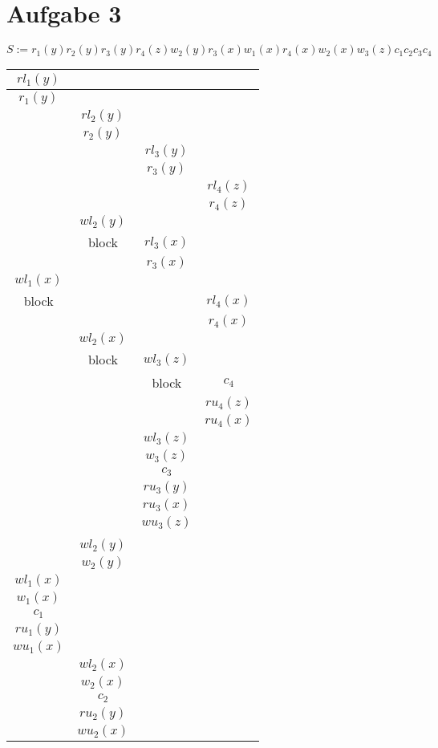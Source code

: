 \documentclass{scrartcl}
\begin{document}
\section*{Aufgabe 3}

$S := r_1(y)r_2(y)r_3(y)r_4(z)w_2(y)r_3(x)w_1(x)r_4(x)w_2(x)w_3(z)c_1c_2c_3c_4$\\
\begin{tabular}{|c|c|c|c|}
\hline $rl_1(y)$ &  &  &  \\ 
\hline $r_1(y)$ &  &  &  \\ 
\hline  & $rl_2(y)$ &  &  \\ 
\hline  & $r_2(y)$ &  &  \\ 
\hline  &  & $rl_3(y)$ &  \\ 
\hline  &  & $r_3(y)$ &  \\ 
\hline  &  &  & $rl_4(z)$ \\ 
\hline  &  &  & $r_4(z)$ \\ 
\hline  & $wl_2(y)$ &  &  \\ 
\hline  & block & $rl_3(x)$ &  \\ 
\hline  &  & $r_3(x)$ &  \\ 
\hline $wl_1(x)$ &  &  &  \\ 
\hline block &  &  & $rl_4(x)$ \\ 
\hline  &  &  & $r_4(x)$ \\ 
\hline  & $wl_2(x)$ &  &  \\ 
\hline  & block & $wl_3(z)$ &  \\
\hline  &  & block & $c_4$ \\ 
\hline  &  &  & $ru_4(z)$ \\ 
\hline  &  &  & $ru_4(x)$ \\ 
\hline  &  & $wl_3(z)$ &  \\
\hline  &  & $w_3(z)$ &  \\
\hline  &  & $c_3$ &  \\
\hline  &  & $ru_3(y)$ &  \\
\hline  &  & $ru_3(x)$ &  \\
\hline  &  & $wu_3(z)$ &  \\
\hline  &  &  &  \\
\hline  & $wl_2(y)$ &  &  \\
\hline  & $w_2(y)$ &  &  \\
\hline $wl_1(x)$ &  &  &  \\
\hline $w_1(x)$ &  &  &  \\
\hline $c_1$ &  &  &  \\
\hline $ru_1(y)$ &  &  &  \\
\hline $wu_1(x)$ &  &  &  \\
\hline  & $wl_2(x)$ &  &  \\
\hline  & $w_2(x)$ &  &  \\
\hline  & $c_2$ &  &  \\
\hline  & $ru_2(y)$ &  &  \\
\hline  & $wu_2(x)$ &  &  \\
\hline 
\end{tabular} 
\end{document}
